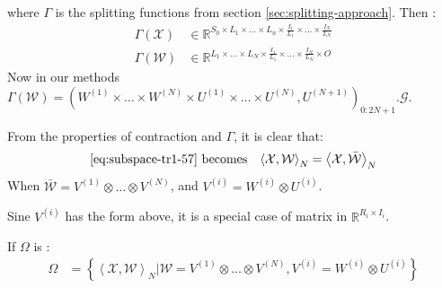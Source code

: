\documentclass{article}
\begin{document}
where $\Gamma$ is the splitting functions from section \ref{sec:splitting-approach}.  Then : 
\begin{align}
	\label{eq:subspace-tr1-58}
	\Gamma(\mathcal{X}) &\in \mathbb{R}^{S_0\times L_1\times \dots\times L_n\times \frac{I_1}{L_1}\times\dots\times \frac{I_N}{L_N}} 
	\nonumber\\
	\Gamma(\mathcal{W}) &\in \mathbb{R}^{L_1\times\dots\times L_N\times\frac{I_1}{L_1}\times\dots\times \frac{I_N}{L_N} \times O}
\end{align}
Now in our methods $\Gamma(\mathcal{W}) = \left(W^{(1)}\times \dots\times W^{(N)}\times U^{(1)}\times \dots\times U^{(N)}, U^{(N+1)}\right)_{0:2N+1}.\mathcal{G}$.

From the properties of contraction and $\Gamma$, it is clear that:
\begin{align}
		\label{eq:subspace-tr1-59}
		\text{\ref{eq:subspace-tr1-57} becomes}\hspace{3mm} 
		\left\langle \mathcal{X}, \mathcal{W}\right\rangle_N = \left\langle \mathcal{X}, \bar{\mathcal{W}}\right\rangle_N
\end{align}
When $\bar{\mathcal{W}} = V^{(1)} \otimes \dots \otimes V^{(N)}$, and $V^{(i)} = W^{(i)}\otimes U^{(i)}$.

Sine $V^{(i)}$ has the form above,  it is a special case of matrix in $\mathbb{R}^{R_i\times I_i}$.

If $\Omega$ is :
\begin{align}
	\label{eq:subspace-tr1-60}
	\Omega &= \left\{\left\langle\mathcal{X},\mathcal{W} \right\rangle_N | \mathcal{W} = V^{(1)}\otimes \dots\otimes V^{(N)}, V^{(i)} = W^{(i)}\otimes U^{(i)}\right\}
\end{align}
\end{document}
